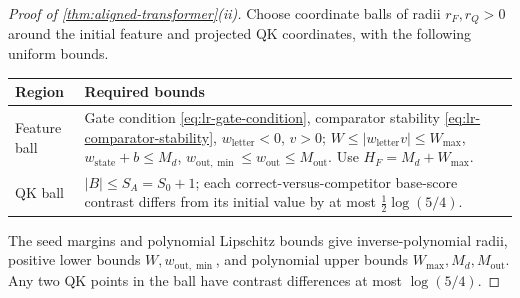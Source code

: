 \begin{proof}[Proof of \cref{thm:aligned-transformer}(ii)]
Choose coordinate balls of radii $r_F,r_Q>0$ around the initial feature
and projected QK coordinates, with the following uniform bounds.
\begin{center}
\small
\begin{tabular}{@{}p{.17\linewidth}p{.77\linewidth}@{}}
\toprule
Region & Required bounds \\
\midrule
Feature ball & Gate condition \eqref{eq:lr-gate-condition}, comparator stability
\eqref{eq:lr-comparator-stability}, $w_{\mathrm{letter}}<0$, $v>0$;
$W\le|w_{\mathrm{letter}}v|\le W_{\max}$,
$w_{\mathrm{state}}+b\le M_d$,
$w_{\mathrm{out},\min}\le w_{\mathrm{out}}\le M_{\mathrm{out}}$.
Use $H_F=M_d+W_{\max}$. \\
QK ball & $|B|\le S_A=S_0+1$; each correct-versus-competitor base-score
contrast differs from its initial value by at most $\frac12\log(5/4)$. \\
\bottomrule
\end{tabular}
\end{center}
The seed margins and polynomial Lipschitz bounds give inverse-polynomial
radii, positive lower bounds $W,w_{\mathrm{out},\min}$, and polynomial upper
bounds $W_{\max},M_d,M_{\mathrm{out}}$. Any two QK points in the ball have
contrast differences at most $\log(5/4)$.


\end{proof}
